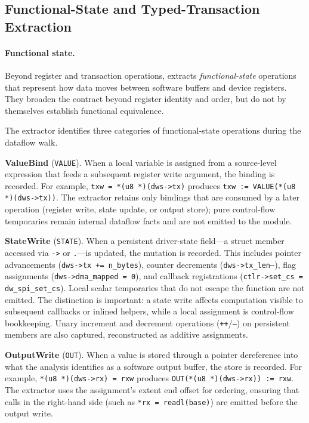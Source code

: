 \subsection{Functional-State and Typed-Transaction Extraction}

\paragraph{Functional state.}

Beyond register and transaction operations, \reharness{} extracts \emph{functional-state} operations that represent how data moves between software buffers and device registers. They broaden the contract beyond register identity and order, but do not by themselves establish functional equivalence.

The extractor identifies three categories of functional-state operations during the dataflow walk.

\textbf{ValueBind} (\texttt{VALUE}). When a local variable is assigned from a source-level expression that feeds a subsequent register write argument, the binding is recorded. For example, \texttt{txw = *(u8 *)(dws->tx)} produces \texttt{txw := VALUE(*(u8 *)(dws->tx))}. The extractor retains only bindings that are consumed by a later operation (register write, state update, or output store); pure control-flow temporaries remain internal dataflow facts and are not emitted to the \rislang{} module.

\textbf{StateWrite} (\texttt{STATE}). When a persistent driver-state field---a struct member accessed via \texttt{->} or \texttt{.}---is updated, the mutation is recorded. This includes pointer advancements (\texttt{dws->tx += n\_bytes}), counter decrements (\texttt{dws->tx\_len--}), flag assignments (\texttt{dws->dma\_mapped = 0}), and callback registrations (\texttt{ctlr->set\_cs = dw\_spi\_set\_cs}). Local scalar temporaries that do not escape the function are not emitted. The distinction is important: a state write affects computation visible to subsequent callbacks or inlined helpers, while a local assignment is control-flow bookkeeping. Unary increment and decrement operations (\texttt{++}/\texttt{--}) on persistent members are also captured, reconstructed as additive assignments.

\textbf{OutputWrite} (\texttt{OUT}). When a value is stored through a pointer dereference into what the analysis identifies as a software output buffer, the store is recorded. For example, \texttt{*(u8 *)(dws->rx) = rxw} produces \texttt{OUT(*(u8 *)(dws->rx)) := rxw}. The extractor uses the assignment's extent end offset for ordering, ensuring that calls in the right-hand side (such as \texttt{*rx = readl(base)}) are emitted before the output write.

